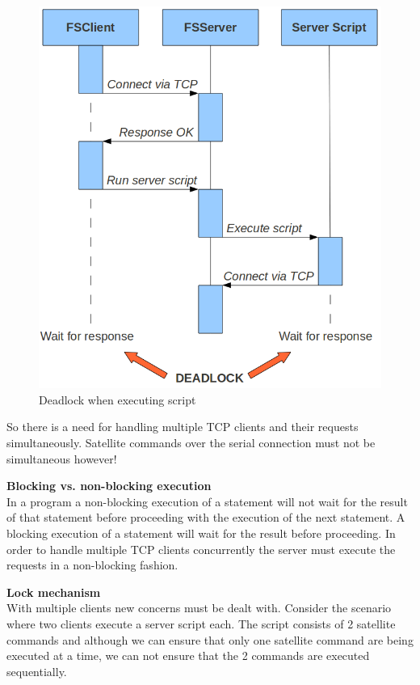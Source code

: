 \begin{figure}[h!] \centering
	\includegraphics[scale=0.5]{img/one_connection_deadlock}
  \caption{Deadlock when executing script}
\end{figure}

So there is a need for handling multiple TCP clients and their requests simultaneously. Satellite commands over the serial connection must not be simultaneous however!

\textbf{Blocking vs. non-blocking execution} \\
In a program a non-blocking execution of a statement will not wait for the result of that statement before proceeding with the execution of the next statement. A blocking execution of a statement will wait for the result before proceeding.
In order to handle multiple TCP clients concurrently the server must execute the requests in a non-blocking fashion.

\textbf{Lock mechanism} \\
With multiple clients new concerns must be dealt with. Consider the scenario where two clients execute a server script each. The script consists of 2 satellite commands and although we can ensure that only one satellite command are being executed at a time, we can not ensure that the 2 commands are executed sequentially.


